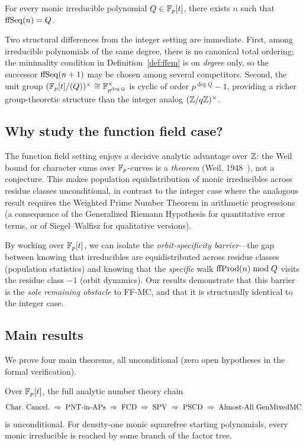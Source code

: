 \begin{openproblem}
For every monic irreducible polynomial $Q \in \mathbb{F}_p[t]$, there exists $n$ such
that $\mathrm{ffSeq}(n) = Q$.
\end{openproblem}

Two structural differences from the integer setting are immediate.
First, among irreducible polynomials of the same degree, there is no
canonical total ordering; the minimality condition in Definition~\ref{def:ffem}
is on \emph{degree} only, so the successor $\mathrm{ffSeq}(n+1)$ may be chosen
among several competitors. Second, the unit group
$(\mathbb{F}_p[t]/(Q))^\times \cong \mathbb{F}_{p^{\deg Q}}^\times$ is cyclic of order
$p^{\deg Q} - 1$, providing a richer group-theoretic structure than the
integer analog $(\mathbb{Z}/q\mathbb{Z})^\times$.

\subsection{Why study the function field case?}

The function field setting enjoys a decisive analytic advantage over
$\mathbb{Z}$: the Weil bound for character sums over $\mathbb{F}_p$-curves is a
\emph{theorem} (Weil, 1948~\cite{Weil48}), not a conjecture. This
makes population equidistribution of monic irreducibles across residue
classes unconditional, in contrast to the integer case where the
analogous result requires the Weighted Prime Number Theorem in
arithmetic progressions (a consequence of the Generalized Riemann
Hypothesis for quantitative error terms, or of Siegel--Walfisz for
qualitative versions).

By working over $\mathbb{F}_p[t]$, we can isolate the \emph{orbit-specificity
barrier}---the gap between knowing that irreducibles are equidistributed
across residue classes (population statistics) and knowing that the
\emph{specific} walk $\mathrm{ffProd}(n) \bmod Q$ visits the residue class $-1$
(orbit dynamics). Our results demonstrate that this barrier is the
\emph{sole remaining obstacle} to FF-MC, and that it is structurally
identical to the integer case.

\subsection{Main results}

We prove four main theorems, all unconditional (zero open hypotheses in the
formal verification).

\begin{theorem}\label{thm:main-sieve}
Over $\mathbb{F}_p[t]$, the full analytic number theory chain
\[
  \text{Char.\ Cancel.} \;\Rightarrow\; \text{PNT-in-APs}
  \;\Rightarrow\; \mathrm{FCD} \;\Rightarrow\; \mathrm{SPV}
  \;\Rightarrow\; \mathrm{PSCD} \;\Rightarrow\; \text{Almost-All GenMixedMC}
\]
is unconditional. For density-one monic squarefree starting polynomials,
every monic irreducible is reached by some branch of the factor tree.
\end{theorem}

